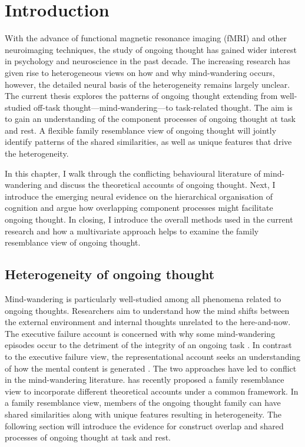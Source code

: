 \chapter{Introduction}
\label{ch:intro}

With the advance of functional magnetic resonance imaging (fMRI) and other neuroimaging techniques, the study of ongoing thought has gained wider interest in psychology and neuroscience in the past decade. The increasing research has given rise to heterogeneous views on how and why mind-wandering occurs, however, the detailed neural basis of the heterogeneity remains largely unclear. The current thesis explores the patterns of ongoing thought extending from well-studied off-task thought---mind-wandering---to task-related thought. The aim is to gain an understanding of the component processes of ongoing thought at task and rest. A flexible family resemblance view \cite{Seli2018} of ongoing thought will jointly identify patterns of the shared similarities, as well as unique features that drive the heterogeneity.

In this chapter, I walk through the conflicting behavioural literature of mind-wandering and discuss the theoretical accounts of ongoing thought. Next, I introduce the emerging neural evidence on the hierarchical organisation of cognition \cite{Margulies2016,Mesulam1998} and argue how overlapping component processes might facilitate ongoing thought. In closing, I introduce the overall methods used in the current research and how a multivariate approach helps to examine the family resemblance view of ongoing thought.

\section{Heterogeneity of ongoing thought}
\label{ch:intro:heterogeneity}


Mind-wandering is particularly well-studied among all phenomena related to ongoing thoughts. Researchers aim to understand how the mind shifts between the external environment and internal thoughts unrelated to the here-and-now. 
The executive failure account is concerned with why some mind-wandering episodes occur to the detriment of the integrity of an ongoing task \cite{McVay2010}. In contrast to the executive failure view, the representational account seeks an understanding of how the mental content is generated \cite{Smallwood2016}. The two approaches have led to conflict in the mind-wandering literature.  has recently proposed a family resemblance view to incorporate different theoretical accounts under a common framework. In a family resemblance view, members of the ongoing thought family can have shared similarities along with unique features resulting in heterogeneity. The following section will introduce the evidence for construct overlap and shared processes of ongoing thought at task and rest.

